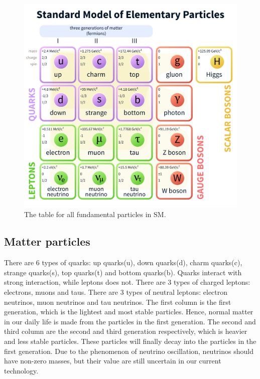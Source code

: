 \begin{figure}
\centering
\includegraphics[width=\textwidth]{data/photo/theory/SM_particles.png}
\caption{The table for all fundamental particles in SM. \cite{SM_particles}}
\label{fig:SM_particles}
\end{figure}

\subsection{Matter particles}
There are 6 types of quarks: up quarks(u), down quarks(d), charm quarks(c), strange quarks(s), top quarks(t) and bottom quarks(b).
Quarks interact with strong interaction, while leptons does not.
There are 3 types of charged leptons: electrons, muons and taus.
There are 3 types of neutral leptons: electron neutrinos, muon neutrinos and tau neutrinos.
The first column is the first generation, which is the lightest and most stable particles.
Hence, normal matter in our daily life is made from the particles in the first generation.
The second and third column are the second and third generation respectively, which is heavier and less stable particles.
These particles will finally decay into the particles in the first generation.
Due to the phenomenon of neutrino oscillation, neutrinos should have non-zero masses, but their value are still uncertain in our current technology.


